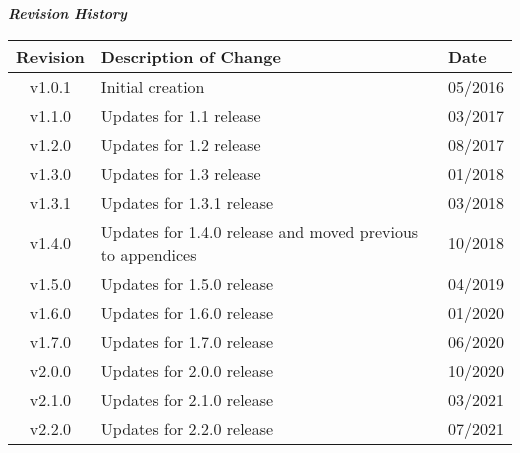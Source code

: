 \maketitle
\thispagestyle{empty}
\newpage

\begin{center}
	\textit{\textbf{Revision History}}
	\begin{table}[H]
		\label{table:revisions} %
		\begin{tabularx}{\textwidth}{|c|X|l|}
			\hline
			\rowcolor{blue}
			\textbf{Revision} & \textbf{Description of Change} & \textbf{Date} \\
		    \hline
			v1.0.1 & Initial creation & 05/2016 \\
			\hline
			v1.1.0 & Updates for 1.1 release & 03/2017 \\
			\hline
			v1.2.0 & Updates for 1.2 release & 08/2017 \\
			\hline
			v1.3.0 & Updates for 1.3 release & 01/2018 \\
			\hline
			v1.3.1 & Updates for 1.3.1 release & 03/2018 \\
			\hline
			v1.4.0 & Updates for 1.4.0 release and moved previous to appendices & 10/2018 \\
			\hline
			v1.5.0 & Updates for 1.5.0 release & 04/2019 \\
			\hline
			v1.6.0 & Updates for 1.6.0 release & 01/2020 \\
			\hline
			v1.7.0 & Updates for 1.7.0 release & 06/2020 \\
			\hline
			v2.0.0 & Updates for 2.0.0 release & 10/2020 \\
			\hline
			v2.1.0 & Updates for 2.1.0 release & 03/2021 \\
			\hline
			v2.2.0 & Updates for 2.2.0 release & 07/2021 \\
			\hline
		\end{tabularx}
	\end{table}
\end{center}
\newpage

\tableofcontents
\renewcommand\thesection{\Roman{section}}
\renewcommand\thesubsection{\thesection-\arabic{subsection}}
\newpage
{}
